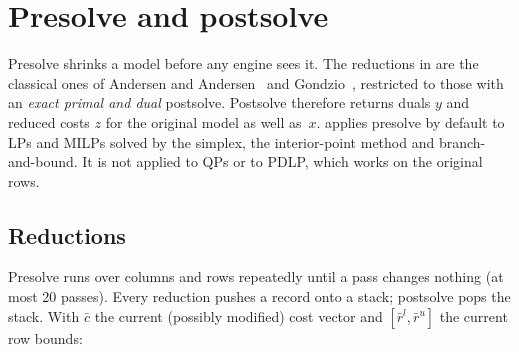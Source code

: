 \section{Presolve and postsolve}\label{sec:presolve}

Presolve shrinks a model before any engine sees it. The reductions in
 are the classical ones of Andersen and Andersen~\cite{andersen1995}
and Gondzio~\cite{gondzio1997}, restricted to those with an \emph{exact primal and dual}
postsolve. Postsolve therefore returns duals $y$ and reduced costs $z$ for the original model as
well as~$x$.  applies presolve by default to LPs and MILPs solved by the simplex,
the interior-point method and branch-and-bound. It is not applied to QPs or to PDLP, which works on the
original rows.

\subsection{Reductions}
Presolve runs over columns and rows repeatedly until a pass changes nothing (at most 20 passes). Every
reduction pushes a record onto a stack; postsolve pops the stack. With $\bar c$ the current
(possibly modified) cost vector and $[\bar r^l,\bar r^u]$ the current row bounds:

